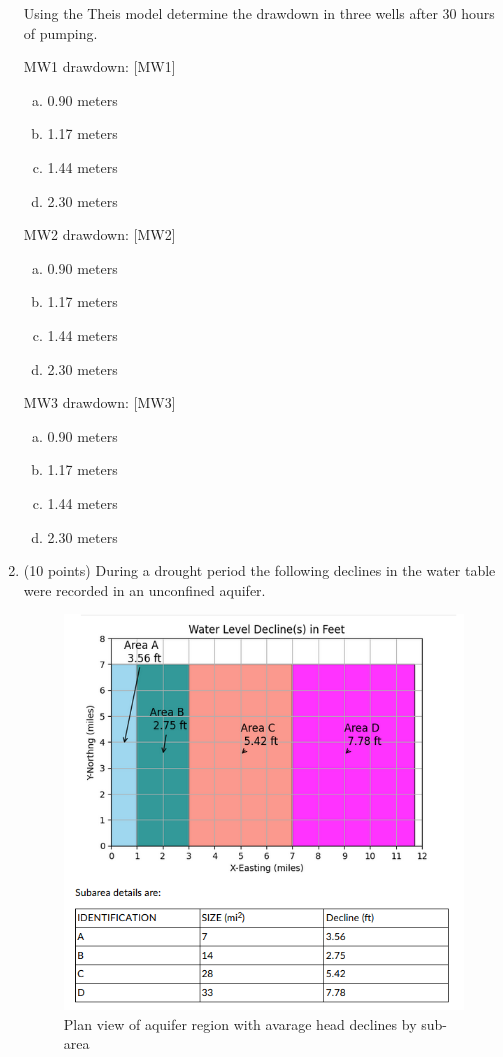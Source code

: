 \documentclass[12pt]{article}
\begin{document}
\begin{enumerate}
Using the Theis model determine the drawdown in three wells after 30 hours of pumping.

MW1 drawdown: [MW1] 
    \begin{enumerate}[a)]
        \item 0.90 meters
        \item 1.17 meters
        \item 1.44 meters %
        \item 2.30 meters
    \end{enumerate}

MW2 drawdown: [MW2] 
    \begin{enumerate}[a)]
        \item 0.90 meters
        \item 1.17 meters %
        \item 1.44 meters 
        \item 2.30 meters
    \end{enumerate}
MW3 drawdown: [MW3]
    \begin{enumerate}[a)]
        \item 0.90 meters %
        \item 1.17 meters 
        \item 1.44 meters 
        \item 2.30 meters
    \end{enumerate}
    
\clearpage
\item (10 points) During a drought period the following declines in the water table were recorded in an unconfined aquifer.

\begin{figure}[h!] %
   \centering
   \includegraphics[width=6in]{Storage.png} 
   \caption{Plan view of aquifer region with avarage head declines by sub-area}
   \label{fig:Storage}
\end{figure}


\end{enumerate}
\end{document}
